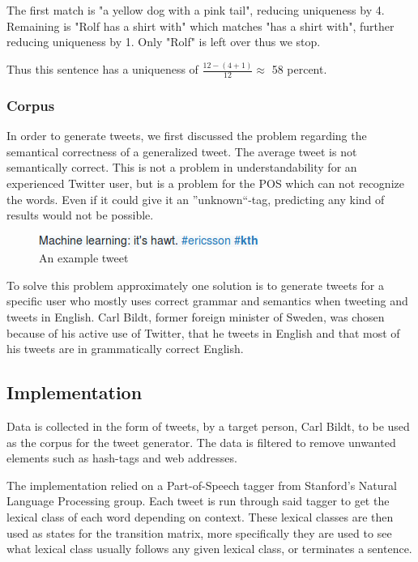 \documentclass[a4paper,12pt]{article}
\begin{document}
The first match is "a yellow dog with a pink tail", reducing uniqueness by 4. Remaining is "Rolf has a shirt with" which matches "has a shirt with", further reducing uniqueness by 1. Only "Rolf" is left over thus we stop. 

Thus this sentence has a uniqueness of $\frac{12 - (4 + 1)}{12} \approx$ 58 percent.

\subsubsection{Corpus}
In order to generate tweets, we first discussed the problem regarding the semantical correctness of a generalized tweet.
The average tweet is not semantically correct. This is not a problem in understandability for an experienced Twitter user,
but is a problem for the POS which can not recognize the words. Even if it could give it an ''unknown``-tag, predicting any kind of results would not be possible.

\begin{figure}[h!]
  \centering
  \includegraphics[width=0.6\linewidth]{machine_learning}
  \caption{An example tweet}
\end{figure}

To solve this problem approximately one solution is to generate tweets for a specific user who mostly uses correct grammar and semantics when tweeting and tweets in English.
Carl Bildt, former foreign minister of Sweden, was chosen because of his active use of Twitter, 
that he tweets in English and that most of his tweets are in grammatically correct English.

\subsection{Implementation}
\label{sec:impl}
Data is collected in the form of tweets, by a target person, Carl Bildt, to be used as the corpus for the tweet generator. The data is filtered to remove unwanted elements such as hash-tags and web addresses.

The implementation relied on a Part-of-Speech tagger from Stanford's Natural Language Processing group. Each tweet is run through said tagger to get the lexical class of each word depending on context.
These lexical classes are then used as states for the transition matrix, more specifically they are used to see what lexical class usually follows any given lexical class, or terminates a sentence.
\end{document}
